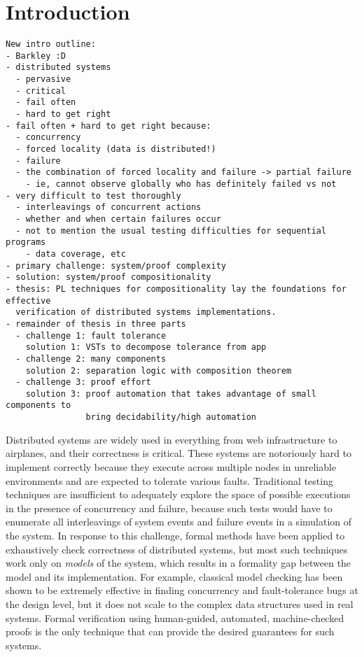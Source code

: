 \chapter{Introduction}
\label{chap:intro}

\begin{verbatim}
New intro outline:
- Barkley :D
- distributed systems
  - pervasive
  - critical
  - fail often
  - hard to get right
- fail often + hard to get right because:
  - concurrency
  - forced locality (data is distributed!)
  - failure
  - the combination of forced locality and failure -> partial failure
    - ie, cannot observe globally who has definitely failed vs not
- very difficult to test thoroughly
  - interleavings of concurrent actions
  - whether and when certain failures occur
  - not to mention the usual testing difficulties for sequential programs
    - data coverage, etc
- primary challenge: system/proof complexity
- solution: system/proof compositionality
- thesis: PL techniques for compositionality lay the foundations for effective
  verification of distributed systems implementations.
- remainder of thesis in three parts
  - challenge 1: fault tolerance
    solution 1: VSTs to decompose tolerance from app
  - challenge 2: many components
    solution 2: separation logic with composition theorem
  - challenge 3: proof effort
    solution 3: proof automation that takes advantage of small components to
                bring decidability/high automation
\end{verbatim}

Distributed systems are widely used
  in everything from web infrastructure to airplanes,
  and their correctness is critical.
These systems are notoriously hard to implement correctly
  because they execute
  across multiple nodes in unreliable environments
  and are expected to tolerate various faults.
Traditional testing techniques are insufficient
  to adequately explore the space of possible executions
  in the presence of concurrency and failure,
  because such tests would have to enumerate
  all interleavings of system events and failure events
  in a simulation of the system.
In response to this challenge,
  formal methods have been applied
  to exhaustively check correctness of distributed systems,
  but most such techniques work only on \emph{models} of the system,
  which results in a formality gap between the model and its implementation.
For example, classical model checking
  has been shown to be extremely effective
  in finding concurrency and fault-tolerance bugs at the design level,
  but it does not scale to the complex data structures used in real systems.
Formal verification
  using human-guided, automated, machine-checked proofs
  is the only technique that can provide the desired guarantees for such systems.

